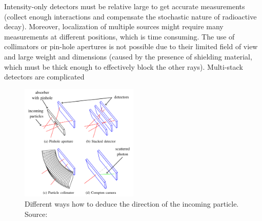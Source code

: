 {  %
  Intensity-only detectors must be relative large to get accurate measurements (collect enough interactions and compensate the stochastic nature of radioactive decay).  
  Moreover, localization of multiple sources might require many measurements at different positions, which is time consuming.
  The use of collimators or pin-hole apertures is not possible due to their limited field of view and large weight and dimensions (caused by the presence of shielding material, which must be thick enough to effectively block the other rays).
  Multi-stack detectors are complicated 
  \begin{figure}[!h]
      \centering
      \includegraphics[width=0.5\textwidth]{./fig/photos/detector_overview_baca2019.png}
      \caption{Different ways how to deduce the direction of the incoming particle. Source: \cite{baca2019timepix}}
      \label{fig:sensor_overview}
  \end{figure}
}%

